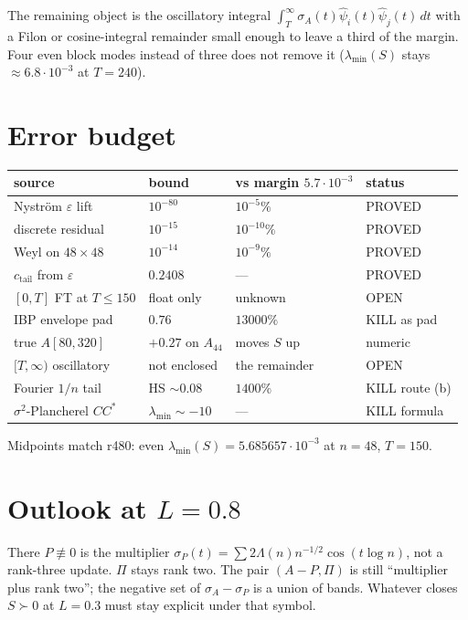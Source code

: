 \documentclass[11pt]{article}
\theoremstyle{remark}
\begin{document}
The remaining object is the oscillatory integral
$\int_T^\infty\sigma_A(t)\hat\psi_i(t)\hat\psi_j(t)\,dt$
with a Filon or cosine-integral remainder small enough
to leave a third of the margin.
Four even block modes instead of three does not remove it
($\lambda_{\min}(S)$ stays $\approx6.8\cdot10^{-3}$ at $T=240$).

\section{Error budget}

\begin{center}
\small
\begin{tabular}{@{}llll@{}}
\toprule
source & bound & vs margin $5.7\cdot10^{-3}$ & status\\
\midrule
Nystr\"om $\varepsilon$ lift & $10^{-80}$ & $10^{-5}\%$ & PROVED\\
discrete residual & $10^{-15}$ & $10^{-10}\%$ & PROVED\\
Weyl on $48\times48$ & $10^{-14}$ & $10^{-9}\%$ & PROVED\\
$c_{\mathrm{tail}}$ from $\varepsilon$ & $0.2408$ & --- & PROVED\\
$[0,T]$ FT at $T\le150$ & float only & unknown & OPEN\\
IBP envelope pad & $0.76$ & $13000\%$ & KILL as pad\\
true $A[80,320]$ & $+0.27$ on $A_{44}$ & moves $S$ up & numeric\\
$[T,\infty)$ oscillatory & not enclosed & the remainder & OPEN\\
Fourier $1/n$ tail & HS $\sim0.08$ & $1400\%$ & KILL route (b)\\
$\sigma^2$-Plancherel $CC^*$ & $\lambda_{\min}\sim-10$ & --- & KILL formula\\
\bottomrule
\end{tabular}
\end{center}

Midpoints match r480:
even $\lambda_{\min}(S)=5.685657\cdot10^{-3}$ at $n=48$, $T=150$.

\section{Outlook at $L=0.8$}

There $P\not\equiv0$ is the multiplier
$\sigma_P(t)=\sum 2\Lambda(n)n^{-1/2}\cos(t\log n)$,
not a rank-three update.
$\Pi$ stays rank two.
The pair $(A-P,\Pi)$ is still ``multiplier plus rank two'';
the negative set of $\sigma_A-\sigma_P$ is a union of bands.
Whatever closes $S\succ0$ at $L=0.3$ must stay explicit
under that symbol.
\end{document}

